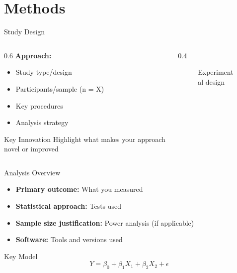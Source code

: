 \documentclass[aspectratio=169,11pt]{beamer}
\begin{document}

\section{Methods}

\begin{frame}{Study Design}
  \begin{columns}[T]

    \begin{column}{0.6\textwidth}
      \textbf{Approach:}
      \begin{itemize}
        \item Study type/design
        \item Participants/sample (n = X)
        \item Key procedures
        \item Analysis strategy
      \end{itemize}

      \vspace{0.5cm}

      \begin{alertblock}{Key Innovation}
        Highlight what makes your approach novel or improved
      \end{alertblock}
    \end{column}

    \begin{column}{0.4\textwidth}
      \begin{figure}
        \centering
        \caption{Experimental design}
      \end{figure}
    \end{column}

  \end{columns}
\end{frame}

\begin{frame}{Analysis Overview}
  \begin{itemize}
    \item \textbf{Primary outcome:} What you measured
    \item \textbf{Statistical approach:} Tests used
    \item \textbf{Sample size justification:} Power analysis (if applicable)
    \item \textbf{Software:} Tools and versions used
  \end{itemize}

  \vspace{0.5cm}

  \begin{exampleblock}{Key Model}
    \begin{equation}
      Y = \beta_0 + \beta_1 X_1 + \beta_2 X_2 + \epsilon
    \end{equation}
  \end{exampleblock}
\end{frame}
\end{document}
